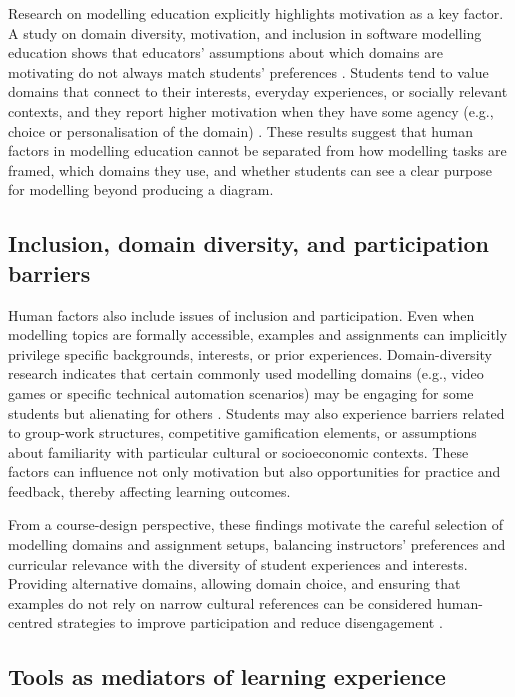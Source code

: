 Research on modelling education explicitly highlights motivation as a key factor. A study on domain diversity, motivation, and inclusion in software modelling education shows that educators' assumptions about which domains are motivating do not always match students' preferences \cite{grassl2026dei}. Students tend to value domains that connect to their interests, everyday experiences, or socially relevant contexts, and they report higher motivation when they have some agency (e.g., choice or personalisation of the domain) \cite{grassl2026dei}. These results suggest that human factors in modelling education cannot be separated from how modelling tasks are framed, which domains they use, and whether students can see a clear purpose for modelling beyond producing a diagram.


\subsection{Inclusion, domain diversity, and participation barriers}
\label{subsec:hf_inclusion_domain}

Human factors also include issues of inclusion and participation. Even when modelling topics are formally accessible, examples and assignments can implicitly privilege specific backgrounds, interests, or prior experiences. Domain-diversity research indicates that certain commonly used modelling domains (e.g., video games or specific technical automation scenarios) may be engaging for some students but alienating for others \cite{grassl2026dei}. Students may also experience barriers related to group-work structures, competitive gamification elements, or assumptions about familiarity with particular cultural or socioeconomic contexts. These factors can influence not only motivation but also opportunities for practice and feedback, thereby affecting learning outcomes.

From a course-design perspective, these findings motivate the careful selection of modelling domains and assignment setups, balancing instructors' preferences and curricular relevance with the diversity of student experiences and interests. Providing alternative domains, allowing domain choice, and ensuring that examples do not rely on narrow cultural references can be considered human-centred strategies to improve participation and reduce disengagement \cite{grassl2026dei}.

\subsection{Tools as mediators of learning experience}
\label{subsec:hf_tools_mediator}

